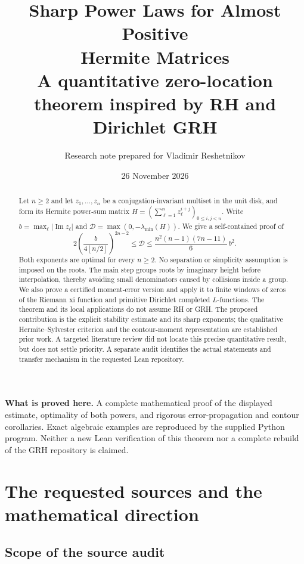 \documentclass[11pt]{article}
\title{\color{ink}\LARGE Sharp Power Laws for Almost Positive\\[3pt] Hermite Matrices\\[7pt]\large A quantitative zero-location theorem inspired by RH and Dirichlet GRH}
\author{Research note prepared for Vladimir Reshetnikov}
\date{26 November 2026}
\theoremstyle{definition}
\newcommand{\Impart}{\operatorname{Im}}
\newcommand{\defect}{\mathcal D}
\newcommand{\floor}[1]{\left\lfloor#1\right\rfloor}
\begin{document}
\maketitle
\thispagestyle{empty}
\begin{abstract}
Let $n\geq2$ and let $z_1,\ldots,z_n$ be a conjugation-invariant multiset in the unit disk,
and form its Hermite power-sum matrix
$H=(\sum_{\ell=1}^n z_\ell^{i+j})_{0\leq i,j<n}$.
Write $b=\max_\ell|\Impart z_\ell|$ and
$\defect=\max(0,-\lambda_{\min}(H))$.
We give a self-contained proof of
\[
 2\left(\frac{b}{4\floor{n/2}}\right)^{2n-2}
 \leq \defect
 \leq \frac{n^2(n-1)(7n-11)}6\,b^2.
\]
Both exponents are optimal for every $n\geq2$. No separation or simplicity
assumption is imposed on the roots. The main step groups roots by imaginary
height before interpolation, thereby avoiding small denominators caused by
collisions inside a group. We also prove a certified moment-error version and
apply it to finite windows of zeros of the Riemann xi function and primitive
Dirichlet completed $L$-functions. The theorem and its local applications do not
assume RH or GRH. The proposed contribution is the explicit stability estimate
and its sharp exponents; the qualitative Hermite--Sylvester criterion and the
contour-moment representation are established prior work. A targeted literature
review did not locate this precise quantitative result, but does not settle
priority. A separate audit identifies the actual statements and transfer
mechanism in the requested Lean repository.
\end{abstract}

\vspace{4pt}
\noindent\textbf{What is proved here.}
A complete mathematical proof of the displayed estimate, optimality of both
powers, and rigorous error-propagation and contour corollaries. Exact algebraic
examples are reproduced by the supplied Python program. Neither a new Lean
verification of this theorem nor a complete rebuild of the GRH repository is
claimed.

\newpage
\tableofcontents
\newpage

\section{The requested sources and the mathematical direction}
\label{sec:sources}

\subsection{Scope of the source audit}
\end{document}
